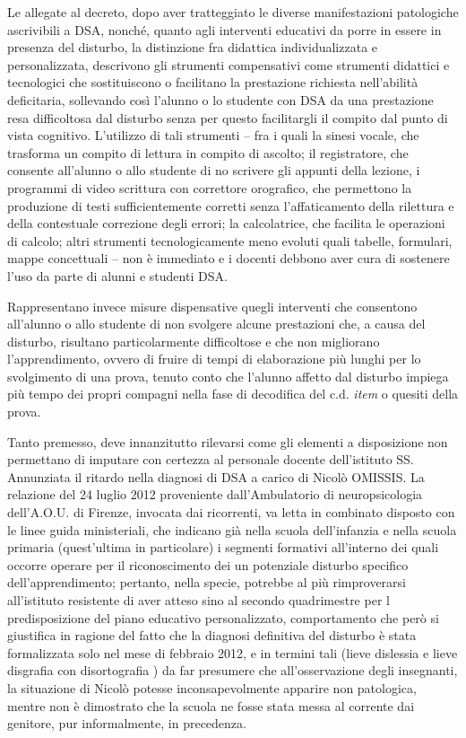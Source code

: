  Le  allegate al decreto, dopo aver tratteggiato le diverse manifestazioni patologiche ascrivibili a DSA, nonché, quanto agli interventi educativi da porre in essere in presenza del disturbo, la distinzione fra didattica individualizzata e personalizzata, descrivono gli strumenti compensativi come strumenti didattici e tecnologici che sostituiscono o facilitano la prestazione richiesta nell'abilità deficitaria, sollevando così l'alunno o lo studente con DSA da una prestazione resa difficoltosa dal disturbo senza per questo facilitargli il compito dal punto di vista cognitivo. L'utilizzo di tali strumenti -- fra i quali la sinesi vocale, che trasforma un compito di lettura in compito di ascolto; il registratore, che consente all'alunno o allo studente di no scrivere gli appunti della lezione, i programmi di video scrittura con correttore orografico, che permettono la produzione di testi sufficientemente corretti senza l'affaticamento della rilettura e della contestuale correzione degli errori; la calcolatrice, che facilita le operazioni di calcolo; altri strumenti tecnologicamente meno evoluti quali tabelle, formulari, mappe concettuali -- non è immediato e i docenti debbono aver cura di sostenere l'uso da parte di alunni e studenti DSA.
 
 Rappresentano invece misure dispensative quegli interventi che consentono all'alunno o allo studente di non svolgere alcune prestazioni che, a causa del disturbo, risultano particolarmente difficoltose e che non migliorano l'apprendimento, ovvero di fruire di tempi di elaborazione più lunghi per lo svolgimento di una prova, tenuto conto che l'alunno affetto dal disturbo impiega più tempo dei propri compagni nella fase di decodifica del c.d. \textit{item} o quesiti della prova.
 
 Tanto premesso, deve innanzitutto rilevarsi come gli elementi a disposizione non permettano di imputare con certezza al personale docente dell'istituto SS. Annunziata il ritardo nella diagnosi di DSA a carico di Nicolò OMISSIS. La relazione del 24 luglio 2012 proveniente dall'Ambulatorio di neuropsicologia dell'A.O.U.  di Firenze, invocata dai ricorrenti, va letta in combinato disposto con le linee guida ministeriali, che indicano già nella scuola dell'infanzia e nella scuola primaria (quest'ultima in particolare) i segmenti formativi all'interno dei quali occorre operare per il riconoscimento dei un potenziale disturbo specifico dell'apprendimento; pertanto, nella specie, potrebbe al più rimproverarsi all'istituto resistente di aver atteso sino al secondo quadrimestre per l predisposizione del piano educativo personalizzato, comportamento che però si giustifica in ragione del fatto che la diagnosi definitiva del disturbo è stata formalizzata solo nel mese di febbraio 2012, e in termini tali (lieve dislessia e lieve disgrafia con disortografia ) da far presumere che all'osservazione degli insegnanti, la situazione di Nicolò potesse inconsapevolmente apparire non patologica, mentre non è dimostrato che la scuola ne fosse stata messa al corrente dai genitore, pur informalmente, in precedenza.
 
